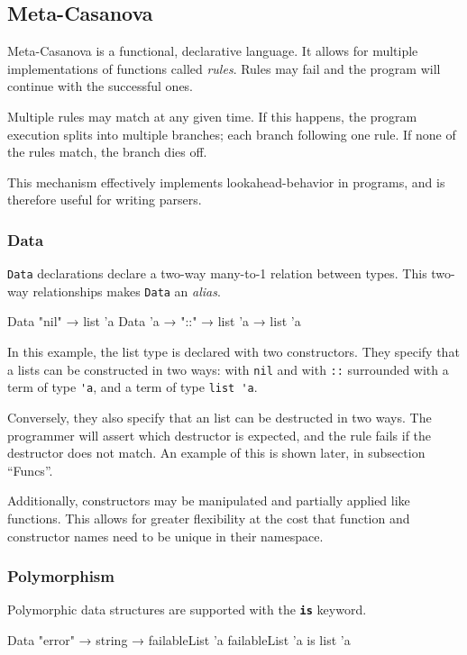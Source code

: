 \subsection{Meta-Casanova}
  Meta-Casanova is a functional, declarative language.
  It allows for multiple implementations of functions called \textit{rules}.
  Rules may fail and the program will continue with the successful ones.

  Multiple rules may match at any given time.
  If this happens, the program execution splits into multiple branches; each branch following one rule.
  If none of the rules match, the branch dies off. 

  This mechanism effectively implements lookahead-behavior in programs, and is therefore useful for writing parsers.
  
  \subsubsection*{Data}
  \texttt{Data} declarations declare a two-way \mbox{many-to-1} relation between types.
  This two-way relationships makes \texttt{Data} an \textit{alias}.

  \begin{code}
  Data "nil" → list 'a
  Data 'a → "::" → list 'a → list 'a
  \end{code}

  In this example, the list type is declared with two constructors.
  They specify that a lists can be constructed in two ways: with \verb|nil| and with \verb|::| surrounded with a term of type \verb|'a|, and a term of type \verb|list 'a|.

  Conversely, they also specify that an list can be destructed in two ways.
  The programmer will assert which destructor is expected, and the rule fails if the destructor does not match.
  An example of this is shown later, in subsection ``Funcs''.

  Additionally, constructors may be manipulated and partially applied like functions.
  This allows for greater flexibility at the cost that function and constructor names need to be unique in their namespace.

  \subsubsection*{Polymorphism}
  Polymorphic data structures are supported with the \textbf{\texttt{is}} keyword.

  \begin{code}
  Data "error" → string → failableList 'a
  failableList 'a is list 'a
  \end{code}

